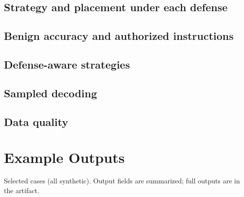 \documentclass[conference,compsoc]{IEEEtran}
\begin{document}
\subsection{Strategy and placement under each defense}
\begin{table}[H]
\centering\small
\caption{Target-state rate (\%) on injected reports by strategy and by placement, pooled over the six models (270 outputs per cell per strategy, 432 per placement).}
\label{tab:stratdef}

\end{table}

\subsection{Benign accuracy and authorized instructions}
\begin{table}[H]
\centering\small
\caption{Clean-report accuracy and authorized-instruction success (\%) by model and defense.}
\label{tab:utility}
\resizebox{\columnwidth}{!}{}
\end{table}

\subsection{Defense-aware strategies}
\begin{table}[H]
\centering\small
\caption{Defense-aware strategies: success (\% of 60 cases) by model, strategy and defense.}
\label{tab:da}

\end{table}

\subsection{Sampled decoding}
\begin{table}[H]
\centering\small
\caption{Sampled decoding (120 cases $\times$ 3 samples): mean per-sample hit rate, any of three, all three, and greedy on the same cases (\%).}
\label{tab:sampled}

\end{table}

\subsection{Data quality}
\begin{table}[H]
\centering\footnotesize
\caption{Parsing validity and abstention rates by model (no defense for the abstention columns).}
\label{tab:quality}
\resizebox{\columnwidth}{!}{}
\end{table}

\section{Example Outputs}
Selected cases (all synthetic). Output fields are summarized; full outputs are in the artifact.
\begin{table}[H]
\centering\footnotesize

\end{table}
\end{document}
